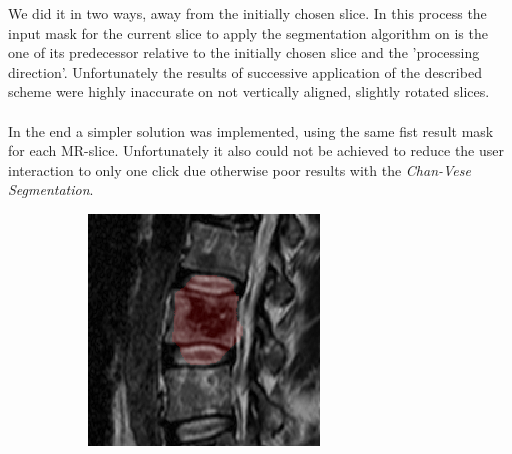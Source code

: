 \documentclass{article}
\begin{document}
{	We did it in two ways, away from the initially chosen slice. In this process the input mask for the current slice to apply the segmentation algorithm on is the one of its predecessor relative to the initially chosen slice and the 'processing direction'.
	Unfortunately the results of successive application of the described scheme were highly inaccurate on not vertically aligned, slightly rotated slices.\\
	\\In the end a simpler solution was implemented, using the same fist result mask for each MR-slice. Unfortunately it also could not be achieved to reduce the user interaction to only one click due otherwise poor results with the \textit{Chan-Vese Segmentation}. 
	\begin{figure}[h]
	\centering
	\begin{subfigure}[t]{0.45\linewidth}
		\centering
		\includegraphics[scale=1.4]{VertebraSegmentationExample_1.png}
		

\end{subfigure}
\end{figure}}
\end{document}
